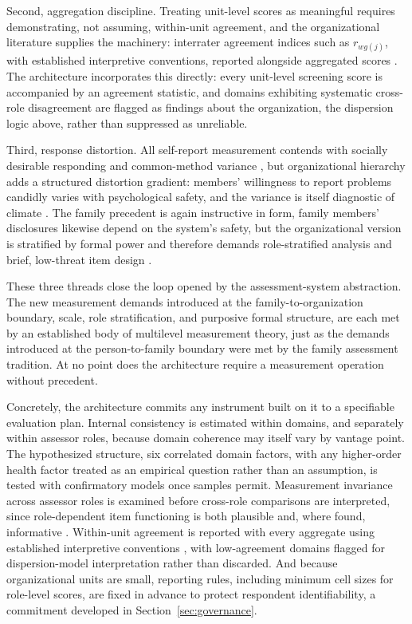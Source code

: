 \documentclass[12pt, letterpaper]{article}
\begin{document}
Second, aggregation discipline. Treating unit-level scores as meaningful requires demonstrating, not assuming, within-unit agreement, and the organizational literature supplies the machinery: interrater agreement indices such as $r_{wg(j)}$, with established interpretive conventions, reported alongside aggregated scores \parencite{james1984,lebreton2008,bliese2000}. The architecture incorporates this directly: every unit-level screening score is accompanied by an agreement statistic, and domains exhibiting systematic cross-role disagreement are flagged as findings about the organization, the dispersion logic above, rather than suppressed as unreliable.

Third, response distortion. All self-report measurement contends with socially desirable responding \parencite{paulhus1984} and common-method variance \parencite{podsakoff2003}, but organizational hierarchy adds a structured distortion gradient: members' willingness to report problems candidly varies with psychological safety, and the variance is itself diagnostic of climate \parencite{edmondson1999}. The family precedent is again instructive in form, family members' disclosures likewise depend on the system's safety, but the organizational version is stratified by formal power and therefore demands role-stratified analysis and brief, low-threat item design \parencite{clark1995,hinkin1998}.

These three threads close the loop opened by the assessment-system abstraction. The new measurement demands introduced at the family-to-organization boundary, scale, role stratification, and purposive formal structure, are each met by an established body of multilevel measurement theory, just as the demands introduced at the person-to-family boundary were met by the family assessment tradition. At no point does the architecture require a measurement operation without precedent.

Concretely, the architecture commits any instrument built on it to a specifiable evaluation plan. Internal consistency is estimated within domains, and separately within assessor roles, because domain coherence may itself vary by vantage point. The hypothesized structure, six correlated domain factors, with any higher-order health factor treated as an empirical question rather than an assumption, is tested with confirmatory models once samples permit. Measurement invariance across assessor roles is examined before cross-role comparisons are interpreted, since role-dependent item functioning is both plausible and, where found, informative \parencite{putnick2016}. Within-unit agreement is reported with every aggregate using established interpretive conventions \parencite{lebreton2008,bliese2000}, with low-agreement domains flagged for dispersion-model interpretation rather than discarded. And because organizational units are small, reporting rules, including minimum cell sizes for role-level scores, are fixed in advance to protect respondent identifiability, a commitment developed in Section~\ref{sec:governance}.
\end{document}
